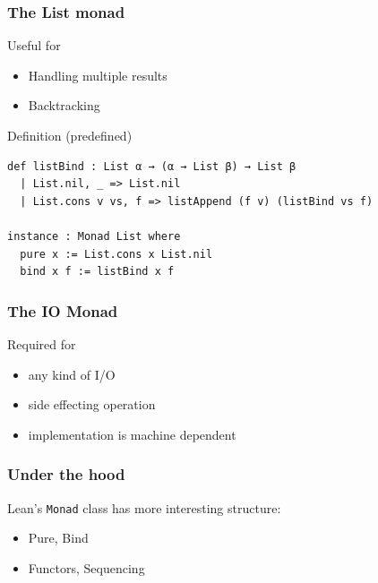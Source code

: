 \documentclass{beamer}
\begin{document}
\begin{frame}[fragile]
  \frametitle{The List monad}
  \begin{block}{Useful for}
                \begin{itemize}         
                        \item Handling multiple results
                        \item Backtracking
                \end{itemize}   
                \end{block}     
\pause
\begin{block}{Definition (predefined)}
\begin{lstlisting}
def listBind : List α → (α → List β) → List β
  | List.nil, _ => List.nil
  | List.cons v vs, f => listAppend (f v) (listBind vs f)

instance : Monad List where
  pure x := List.cons x List.nil
  bind x f := listBind x f
\end{lstlisting}  
\end{block}
\end{frame}             

\begin{frame}[fragile]
  \frametitle{The IO Monad}
  \begin{block}{Required for}
  \begin{itemize}
        \item any kind of I/O
        \item side effecting operation
        \item implementation is machine dependent
  \end{itemize}
  \end{block}
\end{frame}

\begin{frame}
  \frametitle{Under the hood}
  Lean's \lstinline{Monad} class has more interesting structure:
  \begin{itemize}
  \item Pure, Bind
  \item Functors, Sequencing
  \end{itemize}
\end{frame}
\end{document}
